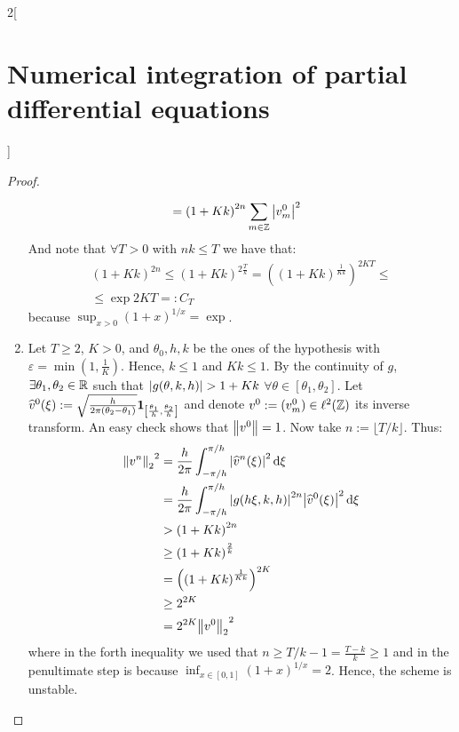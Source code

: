 \documentclass[../../../main_math.tex]{subfiles}
\begin{document}
\begin{multicols}{2}[\section{Numerical integration of partial differential equations}]
\begin{proof}
\begin{enumerate}
\begin{align*}
                                            & ={(1+Kk)}^{2n} \sum_{m\in\mathbb{Z}}\abs{{v}_m^0}^2
            \end{align*}
            And note that $\forall T>0$ with $nk\leq T$ we have that:
            \begin{multline*}
              {(1+Kk)}^{2n}\leq{(1+Kk)}^{2\frac{T}{k}}={\left({(1+Kk)}^\frac{1}{Kk}\right)}^{2 K T}\leq\\\leq \exp{2K T}=:C_T
            \end{multline*}
            because $\sup_{x>0}{(1+x)}^{1/x}=\exp{}$.
      \item Let $T\geq 2$, $K>0$, and $\theta_0,h,k$ be the ones of the hypothesis with $\varepsilon=\min(1,\frac{1}{K})$. Hence, $k\leq 1$ and $Kk\leq 1$. By the continuity of $g$, $\exists \theta_1,\theta_2\in\mathbb{R}$ such that $\abs{g(\theta, k,h)}>1+Kk$ $\forall\theta\in[\theta_1,\theta_2]$. Let $\widehat{v}^0(\xi):=\sqrt{\frac{h}{2\pi(\theta_2-\theta_1)}}\boldsymbol{\mathrm{1}}_{\left[\frac{\theta_1}{h},\frac{\theta_2}{h}\right]}$ and denote $v^0:=(v_m^0)\in\ell^2(\mathbb{Z})$ its inverse transform. An easy check shows that $\left\|v^0\right\|=1$. Now take $n:=\lfloor T/k \rfloor$. Thus:
            \begin{align*}
              {\left\|v^n\right\|_2}^2 & =\frac{h}{2\pi}\int_{-\pi/h}^{\pi/h} \abs{\widehat{v}^n(\xi)}^2\dd{\xi}                        \\
                               & =\frac{h}{2\pi}\int_{-\pi/h}^{\pi/h} \abs{g(h\xi, k,h)}^{2n}\abs{\widehat{v}^0(\xi)}^2\dd{\xi} \\
                               & >{(1+Kk)}^{2n}                                                                                 \\
                               & \geq {(1+Kk)}^{\frac{2}{k}}                                                                    \\
                               & ={\left({(1+Kk)}^{\frac{1}{Kk}}\right)}^{2K}                                                   \\
                               & \geq 2^{2K}                                                                                    \\
                               & =2^{2K}{\left\|v^0\right\|_2}^2
            \end{align*}
            where in the forth inequality we used that $n\geq T/k-1=\frac{T-k}{k}\geq 1$ and in the penultimate step is because $\inf_{x\in[0,1]}{(1+x)}^{1/x}=2$.
            Hence, the scheme is unstable.

\end{enumerate}
\end{proof}
\end{multicols}
\end{document}
